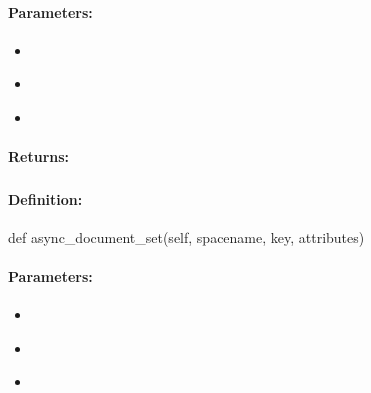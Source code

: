 \paragraph{Parameters:}
\begin{itemize}[noitemsep]
\item {}\\

\item {}\\

\item {}\\

\end{itemize}

\paragraph{Returns:}


\pagebreak
\subsubsection{}
\label{api:python:async_document_set}


\paragraph{Definition:}
\begin{pythoncode}
def async_document_set(self, spacename, key, attributes)
\end{pythoncode}

\paragraph{Parameters:}
\begin{itemize}[noitemsep]
\item {}\\

\item {}\\

\item {}\\

\end{itemize}

